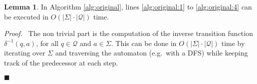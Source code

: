 \documentclass[12pt, a4 paper]{article}
\renewenvironment{proof}[1][Proof]{\begin{mdframed}[backgroundcolor=black!5, topline=false, rightline=false, bottomline=false, linecolor=black!15, linewidth=3pt]{\noindent\textit{#1.}\ }}{\noindent\par\hfill$\blacksquare$\end{mdframed}}
\theoremstyle{definition}
\newtheorem{lemma}{Lemma}
\begin{document}
\bigskip

\begin{lemma}
    In Algorithm \ref{alg:original}, lines \ref{alg:original:1} to \ref{alg:original:4} can be executed in $O(\left| \Sigma \right| \cdot \left| \mathcal{Q} \right|)$ time.
\end{lemma}
\begin{proof}
    The non trivial part is the computation of the inverse transition function $\delta^{-1}(q, a)$, for all $q \in \mathcal{Q}$ and $a \in \Sigma$. This can be done in $O(\left| \Sigma \right| \cdot \left| \mathcal{Q} \right|)$ time by iterating over $\Sigma$ and traversing the automaton (e.g.\ with a DFS) while keeping track of the predecessor at each step.
\end{proof}

\bigskip
\end{document}
